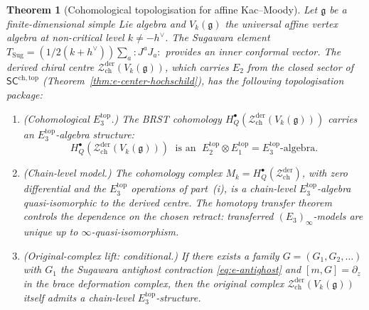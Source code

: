 \documentclass[11pt,reqno]{amsart}
\newtheorem{theorem}{Theorem}[section]
\theoremstyle{definition}
\theoremstyle{remark}
\providecommand{\cZ}{\mathcal{Z}}
\providecommand{\fg}{\mathfrak{g}}
\providecommand{\Eone}{E_1}
\providecommand{\Etwo}{E_2}
\providecommand{\Ethree}{E_3}
\providecommand{\SCchtop}{\ensuremath{\mathsf{SC}^{\mathrm{ch,top}}}}
\begin{document}
\begin{theorem}[Cohomological topologisation for affine Kac--Moody]
\label{thm:e-topologisation}
Let $\fg$ be a finite-dimensional simple Lie algebra and
$V_k(\fg)$ the universal affine vertex algebra at non-critical
level $k \neq -h^\vee$. The Sugawara element
$T_{\mathrm{Sug}} = (1/2(k + h^\vee))\sum_a {:}J^a J_a{:}$
provides an inner conformal vector. The derived chiral centre
$\cZ^{\mathrm{der}}_{\mathrm{ch}}(V_k(\fg))$, which carries
$\Etwo$ from the closed sector of $\SCchtop$
\textup{(}Theorem~\ref{thm:e-center-hochschild}\textup{)}, has
the following topologisation package:
\begin{enumerate}[label=\textup{(\roman*)}]
\item \textup{(Cohomological $\Ethree^{\mathrm{top}}$.)}
 The BRST cohomology
 $H_Q^\bullet(\cZ^{\mathrm{der}}_{\mathrm{ch}}(V_k(\fg)))$
 carries an $\Ethree^{\mathrm{top}}$-algebra structure:
 \begin{equation}\label{eq:e-topologisation}
 H_Q^\bullet(\cZ^{\mathrm{der}}_{\mathrm{ch}}(V_k(\fg)))
 \;\text{ is an }\;
 \Etwo^{\mathrm{top}} \otimes \Eone^{\mathrm{top}}
 = \Ethree^{\mathrm{top}}\text{-algebra.}
 \end{equation}

\item \textup{(Chain-level model.)}
 The cohomology complex
 $M_k = H_Q^\bullet(\cZ^{\mathrm{der}}_{\mathrm{ch}})$,
 with zero differential and the $\Ethree^{\mathrm{top}}$
 operations of part~\textup{(i)}, is a chain-level
 $\Ethree^{\mathrm{top}}$-algebra quasi-isomorphic to the
 derived centre. The homotopy transfer theorem controls the
 dependence on the chosen retract: transferred
 $(E_3)_\infty$-models are unique up to
 $\infty$-quasi-isomorphism.

\item \textup{(Original-complex lift: conditional.)}
 If there exists a family $G = (G_1, G_2, \ldots)$ with
 $G_1$ the Sugawara antighost contraction
 \eqref{eq:e-antighost} and $[m, G] = \partial_z$ in the
 brace deformation complex, then the original complex
 $\cZ^{\mathrm{der}}_{\mathrm{ch}}(V_k(\fg))$ itself
 admits a chain-level $\Ethree^{\mathrm{top}}$-structure.
\end{enumerate}
\end{theorem}
\end{document}
